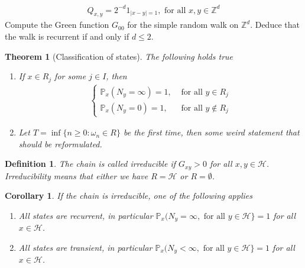 \documentclass[11pt,a4paper, final]{article}
\newtheorem{thm}{Theorem}[section]
\newtheorem{cor}{Corollary}[section]
\newtheorem{defn}{Definition}[section]
\theoremstyle{definition}
\begin{document}
\begin{align*}
Q_{x,y} = 2^{-d} 1_{|x-y|=1}, \text{ for all } x,y \in \mathbb{Z}^d
\end{align*}
Compute the Green function $G_{00}$ for the simple random walk on $\mathbb{Z}^d$. Deduce that the walk is recurrent if and only if $d \leq 2$. 
\begin{thm}[Classification of states] The following holds true
\begin{enumerate}
\item If $x \in R_j$ for some $j \in I$, then 
\begin{align*}
\begin{cases} \mathbb{P}_x ( N_y = \infty) = 1, & \text{ for all } y \in R_j \\ 
\mathbb{P}_x ( N_y = 0) = 1, & \text{ for all } y \notin R_j \end{cases}
\end{align*}
\item Let $T= \inf \lbrace n \geq 0 : \omega_n \in R \rbrace$ be the first time, then some weird statement that should be reformulated. 
\end{enumerate}
\end{thm}
\begin{defn} The chain is called irreducible if $G_{xy} > 0$ for all $x,y \in \mathcal{H}$. Irreducibility means that either we have $R= \mathcal{H}$ or $R= \emptyset$. 
\end{defn}
\begin{cor} If the chain is irreducible, one of the following applies
\begin{enumerate}
\item All states are recurrent, in particular $\mathbb{P}_x( N_y = \infty, \text{ for all } y \in \mathcal{H} \rbrace = 1$ for all $x \in \mathcal{H}$.
\item All states are transient, in particular $\mathbb{P}_x( N_y < \infty, \text{ for all } y \in \mathcal{H} \rbrace = 1$ for all $x \in \mathcal{H}$. 
\end{enumerate}
\end{cor}
\newpage
\end{document}
